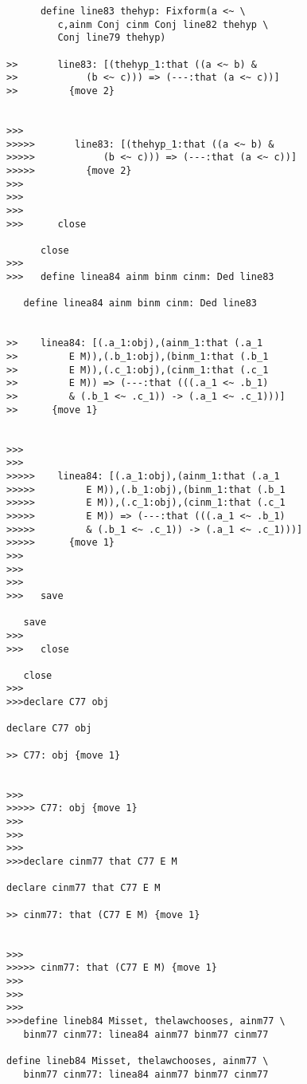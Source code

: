\documentclass[12pt]{article}
\begin{document}
\begin{verbatim}
      define line83 thehyp: Fixform(a <~ \
         c,ainm Conj cinm Conj line82 thehyp \
         Conj line79 thehyp)

>>       line83: [(thehyp_1:that ((a <~ b) &
>>            (b <~ c))) => (---:that (a <~ c))]
>>         {move 2}


>>>
>>>>>       line83: [(thehyp_1:that ((a <~ b) &
>>>>>            (b <~ c))) => (---:that (a <~ c))]
>>>>>         {move 2}
>>>
>>>
>>>
>>>      close

      close
>>>
>>>   define linea84 ainm binm cinm: Ded line83

   define linea84 ainm binm cinm: Ded line83


>>    linea84: [(.a_1:obj),(ainm_1:that (.a_1
>>         E M)),(.b_1:obj),(binm_1:that (.b_1
>>         E M)),(.c_1:obj),(cinm_1:that (.c_1
>>         E M)) => (---:that (((.a_1 <~ .b_1)
>>         & (.b_1 <~ .c_1)) -> (.a_1 <~ .c_1)))]
>>      {move 1}


>>>
>>>
>>>>>    linea84: [(.a_1:obj),(ainm_1:that (.a_1
>>>>>         E M)),(.b_1:obj),(binm_1:that (.b_1
>>>>>         E M)),(.c_1:obj),(cinm_1:that (.c_1
>>>>>         E M)) => (---:that (((.a_1 <~ .b_1)
>>>>>         & (.b_1 <~ .c_1)) -> (.a_1 <~ .c_1)))]
>>>>>      {move 1}
>>>
>>>
>>>
>>>   save

   save
>>>
>>>   close

   close
>>>
>>>declare C77 obj

declare C77 obj

>> C77: obj {move 1}


>>>
>>>>> C77: obj {move 1}
>>>
>>>
>>>
>>>declare cinm77 that C77 E M

declare cinm77 that C77 E M

>> cinm77: that (C77 E M) {move 1}


>>>
>>>>> cinm77: that (C77 E M) {move 1}
>>>
>>>
>>>
>>>define lineb84 Misset, thelawchooses, ainm77 \
   binm77 cinm77: linea84 ainm77 binm77 cinm77

define lineb84 Misset, thelawchooses, ainm77 \
   binm77 cinm77: linea84 ainm77 binm77 cinm77



\end{verbatim}
\end{document}
